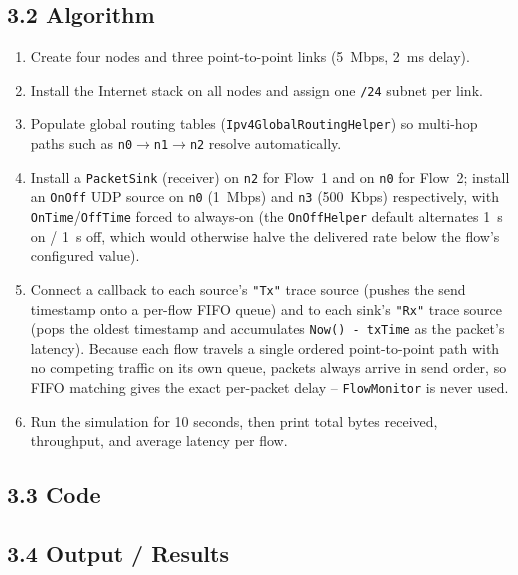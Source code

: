 \documentclass[11pt]{article}
\begin{document}
\subsection*{3.2 Algorithm}
\begin{enumerate}
  \item Create four nodes and three point-to-point links (5~Mbps, 2~ms delay).
  \item Install the Internet stack on all nodes and assign one \texttt{/24}
        subnet per link.
  \item Populate global routing tables (\texttt{Ipv4GlobalRoutingHelper}) so
        multi-hop paths such as \texttt{n0}$\to$\texttt{n1}$\to$\texttt{n2}
        resolve automatically.
  \item Install a \texttt{PacketSink} (receiver) on \texttt{n2} for Flow~1 and
        on \texttt{n0} for Flow~2; install an \texttt{OnOff} UDP source on
        \texttt{n0} (1~Mbps) and \texttt{n3} (500~Kbps) respectively, with
        \texttt{OnTime}/\texttt{OffTime} forced to always-on (the
        \texttt{OnOffHelper} default alternates 1~s on / 1~s off, which would
        otherwise halve the delivered rate below the flow's configured
        value).
  \item Connect a callback to each source's \texttt{"Tx"} trace source
        (pushes the send timestamp onto a per-flow FIFO queue) and to each
        sink's \texttt{"Rx"} trace source (pops the oldest timestamp and
        accumulates \texttt{Now() - txTime} as the packet's latency). Because
        each flow travels a single ordered point-to-point path with no
        competing traffic on its own queue, packets always arrive in send
        order, so FIFO matching gives the exact per-packet delay --
        \texttt{FlowMonitor} is never used.
  \item Run the simulation for 10 seconds, then print total bytes received,
        throughput, and average latency per flow.
\end{enumerate}

\subsection*{3.3 Code}


\subsection*{3.4 Output / Results}

\end{document}
